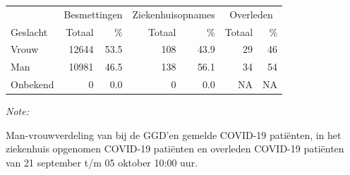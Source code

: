\documentclass[
  english,
  man,floatsintext]{apa6}
\begin{document}
\begin{table}
\centering\begingroup\fontsize{11}{13}\selectfont

\begin{threeparttable}
\begin{tabular}{lrrrrrr}
\toprule
\multicolumn{1}{c}{ } & \multicolumn{2}{c}{Besmettingen} & \multicolumn{2}{c}{Ziekenhuisopnames} & \multicolumn{2}{c}{Overleden} \\
\cmidrule(l{3pt}r{3pt}){2-3} \cmidrule(l{3pt}r{3pt}){4-5} \cmidrule(l{3pt}r{3pt}){6-7}
Geslacht & Totaal & \% & Totaal & \% & Totaal & \%\\
\midrule
Vrouw & 12644 & 53.5 & 108 & 43.9 & 29 & 46\\
Man & 10981 & 46.5 & 138 & 56.1 & 34 & 54\\
Onbekend & 0 & 0.0 & 0 & 0.0 & NA & NA\\
\bottomrule
\end{tabular}
\begin{tablenotes}
\item \textit{Note: } 
\item Man-vrouwverdeling van bij de GGD’en gemelde COVID-19 patiënten, in het ziekenhuis opgenomen COVID-19 patiënten en overleden COVID-19 patiënten van 21 september t/m 05 oktober 10:00 uur.
\end{tablenotes}
\end{threeparttable}
\endgroup{}
\end{table}
\newpage
\end{document}
